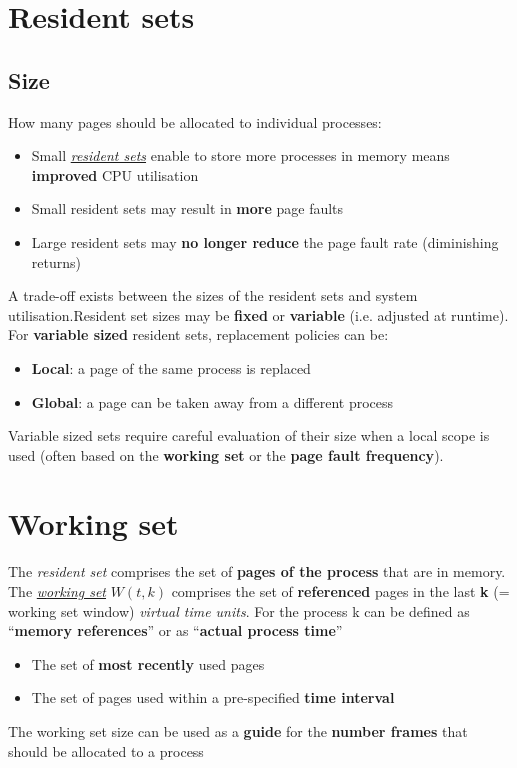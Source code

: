 \documentclass{article}
\newcommand{\worddef}[1]{\hyperref[sec:reference]{\textit{#1}}}
\begin{document}
\section{Resident sets}
\subsection{Size}
\begin{flushleft}
How many pages should be allocated to individual processes:
\begin{itemize}
	\item Small \worddef{resident sets} enable to store more processes in memory means \textbf{improved} CPU utilisation
	\item Small resident sets may result in \textbf{more} page faults
	\item Large resident sets may \textbf{no longer reduce} the page fault rate (diminishing returns) 
\end{itemize}
A trade-off exists between the sizes of the resident sets and system utilisation.Resident set sizes may be \textbf{fixed} or \textbf{variable} (i.e. adjusted at runtime). For \textbf{variable sized} resident sets, replacement policies can be:
\begin{itemize}
	\item \textbf{Local}: a page of the same process is replaced
	\item \textbf{Global}: a page can be taken away from a different process
\end{itemize}
 Variable sized sets require careful evaluation of their size when a local scope is used (often based on the \textbf{working set} or the \textbf{page fault frequency}).
\end{flushleft}

\section{Working set}
\begin{flushleft}
The \textit{resident set} comprises the set of \textbf{pages of the process} that are in memory. The \worddef{working set} $W(t,k)$ comprises the set of \textbf{referenced} pages in the last \textbf{k} (= working set window) \textit{virtual time units}. For the process k can be defined as “\textbf{memory references}” or as “\textbf{actual process time}”
\begin{itemize}
	\item The set of \textbf{most recently} used pages
	\item The set of pages used within a pre-specified \textbf{time interval}
\end{itemize}
The working set size can be used as a \textbf{guide} for the \textbf{number frames} that should be allocated to a process
\end{flushleft}
\end{document}
